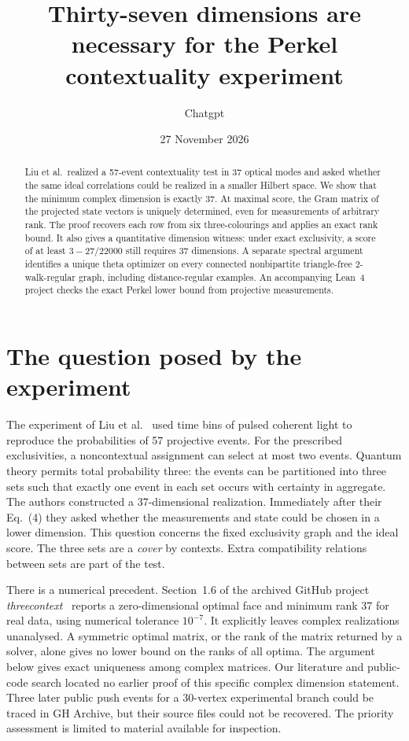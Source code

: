 \documentclass[11pt]{article}
\title{\bfseries Thirty-seven dimensions are necessary for the Perkel contextuality experiment}
\author{Chatgpt}
\date{27 November 2026}
\begin{document}
\maketitle
\begin{abstract}
Liu et al.\ realized a 57-event contextuality test in 37 optical modes and asked whether the same ideal correlations could be realized in a smaller Hilbert space. We show that the minimum complex dimension is exactly 37. At maximal score, the Gram matrix of the projected state vectors is uniquely determined, even for measurements of arbitrary rank. The proof recovers each row from six three-colourings and applies an exact rank bound. It also gives a quantitative dimension witness: under exact exclusivity, a score of at least $3-27/22000$ still requires 37 dimensions. A separate spectral argument identifies a unique theta optimizer on every connected nonbipartite triangle-free $2$-walk-regular graph, including distance-regular examples. An accompanying Lean~4 project checks the exact Perkel lower bound from projective measurements.
\end{abstract}

\section{The question posed by the experiment}
The experiment of Liu et al.~\cite{liu} used time bins of pulsed coherent light to reproduce the probabilities of 57 projective events. For the prescribed exclusivities, a noncontextual assignment can select at most two events. Quantum theory permits total probability three: the events can be partitioned into three sets such that exactly one event in each set occurs with certainty in aggregate. The authors constructed a 37-dimensional realization. Immediately after their Eq.~(4) they asked whether the measurements and state could be chosen in a lower dimension. This question concerns the fixed exclusivity graph and the ideal score. The three sets are a \emph{cover} by contexts. Extra compatibility relations between sets are part of the test.

There is a numerical precedent. Section~1.6 of the archived GitHub project \emph{threecontext}~\cite{repo} reports a zero-dimensional optimal face and minimum rank 37 for real data, using numerical tolerance $10^{-7}$. It explicitly leaves complex realizations unanalysed. A symmetric optimal matrix, or the rank of the matrix returned by a solver, alone gives no lower bound on the ranks of all optima. The argument below gives exact uniqueness among complex matrices. Our literature and public-code search located no earlier proof of this specific complex dimension statement. Three later public push events for a 30-vertex experimental branch could be traced in GH Archive, but their source files could not be recovered. The priority assessment is limited to material available for inspection.
\end{document}
